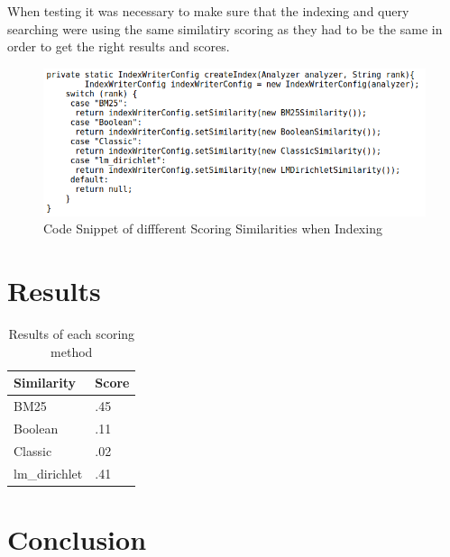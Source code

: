 When testing it was necessary to make sure that the indexing and query searching were using the same similatiry scoring as they had to be the same in order to get the right results and scores. \par
 
	\begin{figure}[ht!]
		\begin{center}
			\includegraphics[scale=.35 ]{3} 
			\caption{Code Snippet of diffferent Scoring Similarities when Indexing}
			\label{fig:1}
		\end{center}
	\end{figure} \par

\section{Results}

	\begin{table}[H]
		\centering
		\begin{tabular}{|p{2.5cm}|p{2.5cm}|}
			\hline
			\textbf{Similarity} 	& \textbf{Score} \\ \hline
			BM25 				& .45 \\ \hline\hline
			Boolean 				& .11 \\ \hline\hline
			Classic 		& .02 \\ \hline\hline
			lm\_dirichlet 			& .41 \\ \hline\hline
		\end{tabular}
		\caption{Results of each scoring method}
		\label{table:weight}
	\end{table}
	
\newpage
\section{Conclusion}
